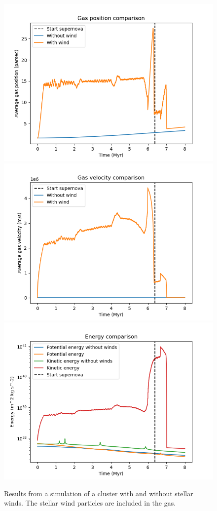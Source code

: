 \documentclass[12pt, twocolumn]{article}
\begin{document}
\begin{figure}[b!]
    \centering
    \includegraphics[width=0.9\linewidth]{figures/avg_pos3.png}
    \includegraphics[width=0.9\linewidth]{figures/avg_vel3.png}
    \includegraphics[width=0.9\linewidth]{figures/energy3.png}
    \caption{Results from a simulation of a cluster with and without stellar winds. The stellar wind particles are included in the gas.}
    \label{fig:r:Results3}
\end{figure}
\end{document}
